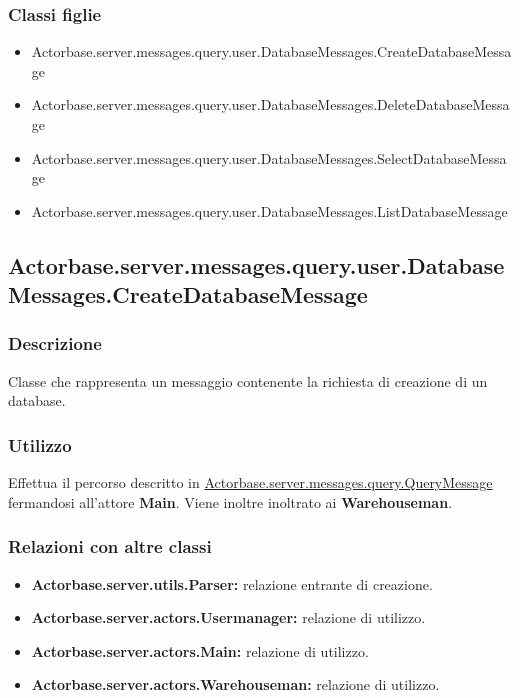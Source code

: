 \documentclass[a4paper]{article}
\begin{document}
			\subsubsection{Classi figlie}
				\begin{itemize}
					\item Actorbase.server.messages.query.user.DatabaseMessages.CreateDatabaseMessage
					\item Actorbase.server.messages.query.user.DatabaseMessages.DeleteDatabaseMessage
					\item Actorbase.server.messages.query.user.DatabaseMessages.SelectDatabaseMessage
					\item Actorbase.server.messages.query.user.DatabaseMessages.ListDatabaseMessage
				\end{itemize}
		
		\subsection{Actorbase.server.messages.query.user.DatabaseMessages.CreateDatabaseMessage}
			\subsubsection{Descrizione}
				Classe che rappresenta un messaggio contenente la richiesta di creazione di un database.
				
			\subsubsection{Utilizzo}
				Effettua il percorso descritto in \hyperref[QueryMessage]{Actorbase.server.messages.query.QueryMessage} fermandosi all'attore \textbf{Main}.
				Viene inoltre inoltrato ai \textbf{Warehouseman}.
				
			\subsubsection{Relazioni con altre classi}
				\begin{itemize}
					\item \textbf{Actorbase.server.utils.Parser:} relazione entrante di creazione.
					\item \textbf{Actorbase.server.actors.Usermanager:} relazione di utilizzo.
					\item \textbf{Actorbase.server.actors.Main:} relazione di utilizzo.
					\item \textbf{Actorbase.server.actors.Warehouseman:} relazione di utilizzo.
				\end{itemize}
\end{document}
